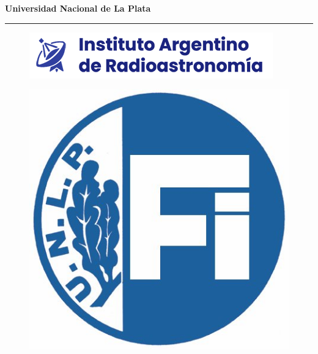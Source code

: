 \graphicspath{{portada}}
\begin{titlepage} 
\vspace{-50mm}
	\begin{center}
{	
 \bf{\fontsize{20}{0}\selectfont Universidad Nacional de La Plata }\\[-5mm]
 \rule[-2mm]{1\linewidth}{1mm}	
}
\end{center}
\vspace{-5mm}
\begin{figure}[ht!]
	\centering
	\includegraphics{portada/Iar-copia} 
\end{figure}

\vspace{-5mm}
\begin{figure}[ht!]
\centering
\includegraphics[scale=0.7]{portada/fac_ingenieria}
\end{figure}
 
{
 \centering \textbf{\fontsize{20}{0}{\selectfont{Facultad de ingeniería}}}\\[2mm]
 \textbf{\fontsize{20}{0}{\selectfont{Departamento de electrotecnia}}}\\[2mm]
 \begin{center} \textbf{\fontsize{20}{0}{\selectfont{Cátedra de trabajo final}}}
 \end{center}	
}


\end{titlepage}
